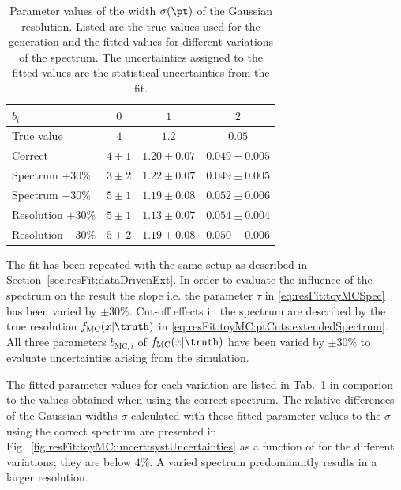 \documentclass[a4paper]{cmspaper} %
\begin{document}
\begin{table}[ht]
  \centering
  \begin{tabular}[ht]{lccc}
    \hline \hline
    $b_{i}$ & $0$ & $1$ & $2$ \\
    \hline
    True value         & $4$       & $1.2$           & $0.05$ \\
    Correct            & $4 \pm 1$ & $1.20 \pm 0.07$ & $0.049 \pm 0.005$ \\
    Spectrum $+30\%$   & $3 \pm 2$ & $1.22 \pm 0.07$ & $0.049 \pm 0.005$ \\
    Spectrum $-30\%$   & $5 \pm 1$ & $1.19 \pm 0.08$ & $0.052 \pm 0.006$ \\
    Resolution $+30\%$ & $5 \pm 1$ & $1.13 \pm 0.07$ & $0.054 \pm 0.004$ \\
    Resolution $-30\%$ & $5 \pm 2$ & $1.19 \pm 0.08$ & $0.050 \pm 0.006$ \\
    \hline \hline
  \end{tabular}
  \caption{Parameter values of the width $\sigma(\pt)$ of the Gaussian resolution.
    Listed are the true values used for the generation and the fitted values for different variations of the spectrum.
    The uncertainties assigned to the fitted values are the statistical uncertainties from the fit.}
  \label{tab:resFit:toyMC:uncert:fitResult}
\end{table}

The fit has been repeated with the same setup as described in Section~\ref{sec:resFit:dataDrivenExt}.
In order to evaluate the influence of the spectrum on the result the slope i.e. the parameter $\tau$ in \eqref{eq:resFit:toyMCSpec} has been varied by $\pm30\%$.
Cut-off effects in the spectrum are described by the true resolution $f_{\text{MC}}(x|\truth)$ in \eqref{eq:resFit:toyMC:ptCuts:extendedSpectrum}.
All three parameters $b_{\text{MC},i}$ of $f_{\text{MC}}(x|\truth)$ have been varied by $\pm30\%$ to evaluate uncertainties arising from the simulation.

The fitted parameter values for each variation are listed in Tab.~\ref{tab:resFit:toyMC:uncert:fitResult} in comparion to the values obtained when using the correct spectrum.
The relative differences of the Gaussian widths $\sigma$ calculated with these fitted parameter values to the $\sigma$ using the correct spectrum are presented in Fig.~\ref{fig:resFit:toyMC:uncert:systUncertainties} as a function of \pt for the different variations; they are below $4\%$.
A varied spectrum predominantly results in a larger resolution.
\end{document}
